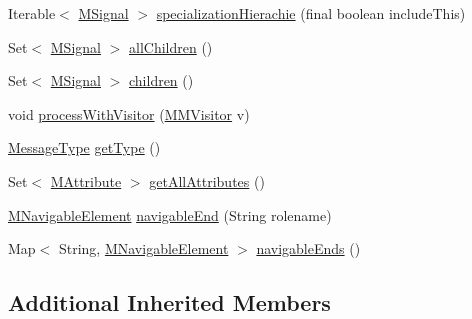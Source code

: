 \begin{DoxyCompactItemize}
\item 
Iterable$<$ \hyperlink{interfaceorg_1_1tzi_1_1use_1_1uml_1_1mm_1_1commonbehavior_1_1communications_1_1_m_signal}{M\-Signal} $>$ \hyperlink{classorg_1_1tzi_1_1use_1_1uml_1_1mm_1_1commonbehavior_1_1communications_1_1_m_signal_impl_abd90230f22781756dceb09dc163319d9}{specialization\-Hierachie} (final boolean include\-This)
\item 
Set$<$ \hyperlink{interfaceorg_1_1tzi_1_1use_1_1uml_1_1mm_1_1commonbehavior_1_1communications_1_1_m_signal}{M\-Signal} $>$ \hyperlink{classorg_1_1tzi_1_1use_1_1uml_1_1mm_1_1commonbehavior_1_1communications_1_1_m_signal_impl_ad992919a029dc1f6a09413c2abfc9c41}{all\-Children} ()
\item 
Set$<$ \hyperlink{interfaceorg_1_1tzi_1_1use_1_1uml_1_1mm_1_1commonbehavior_1_1communications_1_1_m_signal}{M\-Signal} $>$ \hyperlink{classorg_1_1tzi_1_1use_1_1uml_1_1mm_1_1commonbehavior_1_1communications_1_1_m_signal_impl_ad3e5373abdf64a5c4919b1ed7ee2c9de}{children} ()
\item 
void \hyperlink{classorg_1_1tzi_1_1use_1_1uml_1_1mm_1_1commonbehavior_1_1communications_1_1_m_signal_impl_aa2bdc3f9a2f263ae95214b814bd6fcab}{process\-With\-Visitor} (\hyperlink{interfaceorg_1_1tzi_1_1use_1_1uml_1_1mm_1_1_m_m_visitor}{M\-M\-Visitor} v)
\item 
\hyperlink{classorg_1_1tzi_1_1use_1_1uml_1_1ocl_1_1type_1_1_message_type}{Message\-Type} \hyperlink{classorg_1_1tzi_1_1use_1_1uml_1_1mm_1_1commonbehavior_1_1communications_1_1_m_signal_impl_aec90462a0104c7cc061a624e9e6ff629}{get\-Type} ()
\item 
Set$<$ \hyperlink{classorg_1_1tzi_1_1use_1_1uml_1_1mm_1_1_m_attribute}{M\-Attribute} $>$ \hyperlink{classorg_1_1tzi_1_1use_1_1uml_1_1mm_1_1commonbehavior_1_1communications_1_1_m_signal_impl_ae0b8b55271b9c2d4a7c5807445843fc5}{get\-All\-Attributes} ()
\item 
\hyperlink{interfaceorg_1_1tzi_1_1use_1_1uml_1_1mm_1_1_m_navigable_element}{M\-Navigable\-Element} \hyperlink{classorg_1_1tzi_1_1use_1_1uml_1_1mm_1_1commonbehavior_1_1communications_1_1_m_signal_impl_af9a59744e942d14ddec19606a9116625}{navigable\-End} (String rolename)
\item 
Map$<$ String, \hyperlink{interfaceorg_1_1tzi_1_1use_1_1uml_1_1mm_1_1_m_navigable_element}{M\-Navigable\-Element} $>$ \hyperlink{classorg_1_1tzi_1_1use_1_1uml_1_1mm_1_1commonbehavior_1_1communications_1_1_m_signal_impl_a158832bf0afef5d0801c3fad45ebf44d}{navigable\-Ends} ()
\end{DoxyCompactItemize}
\subsection*{Additional Inherited Members}


